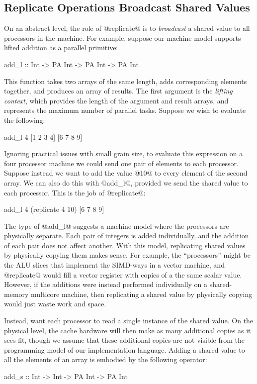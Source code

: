 \subsection{Replicate Operations Broadcast Shared Values}
On an abstract level, the role of @replicate@ is to \emph{broadcast} a shared value to all processors in the machine. For example, suppose our machine model supports lifted addition as a parallel primitive:
\begin{code}
  add_l :: Int -> PA Int -> PA Int -> PA Int
\end{code}

This function takes two arrays of the same length, adds corresponding elements together, and produces an array of results. The first argument is the \emph{lifting context}, which provides the length of the argument and result arrays, and represents the maximum number of parallel tasks. Suppose we wish to evaluate the following:
\begin{code}
  add_l 4 [1 2 3 4] [6 7 8 9]
\end{code}

Ignoring practical issues with small grain size, to evaluate this expression on a four processor machine we could send one pair of elements to each processor. Suppose instead we want to add the value @10@ to every element of the second array. We can also do this with @add_l@, provided we send the shared value to each processor. This is the job of @replicate@:
\begin{code}
  add_l 4 (replicate 4 10) [6 7 8 9]
\end{code}

The type of @add_l@ suggests a machine model where the processors are physically separate. Each pair of integers is added individually, and the addition of each pair does not affect another. With this model, replicating shared values by physically copying them makes sense. For example, the ``processors'' might be the ALU slices that implement the SIMD-ways in a vector machine, and @replicate@ would fill a vector register with copies of a the same scalar value. However, if the additions were instead performed individually on a shared-memory multicore machine, then replicating a shared value by physically copying would just waste work and space.

Instead, want each processor to read a single instance of the shared value. On the physical level, the cache hardware will then make as many additional copies as it sees fit, though we assume that these additional copies are not visible from the programming model of our implementation language. Adding a shared value to all the elements of an array is embodied by the following operator:
\begin{code}
  add_s :: Int -> Int -> PA Int -> PA Int
\end{code}

